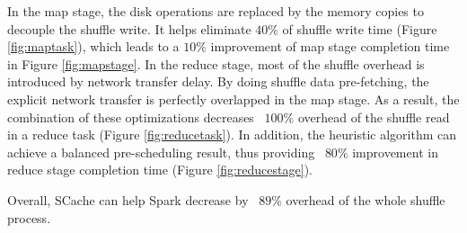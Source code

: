 In the map stage, the disk operations are replaced by the memory copies to decouple the shuffle write. 
It helps eliminate $40\%$ of shuffle write time (Figure \ref{fig:maptask}), which leads to a $10\%$ improvement of map stage completion time in Figure \ref{fig:mapstage}. 
In the reduce stage, most of the shuffle overhead is introduced by network transfer delay. 
By doing shuffle data pre-fetching, the explicit network transfer is perfectly overlapped in the map stage. 
As a result, the combination of these optimizations decreases ~$100\%$ overhead of the shuffle read in a reduce task (Figure \ref{fig:reducetask}). 
In addition, the heuristic algorithm can achieve a balanced pre-scheduling result, thus providing ~$80\%$ improvement in reduce stage completion time (Figure \ref{fig:reducestage}).

Overall, SCache can help Spark decrease by ~$89\%$ overhead of the whole shuffle process. 


